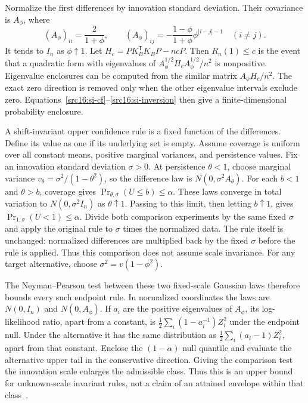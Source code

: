 Normalize the first differences by innovation standard deviation. Their covariance is $A_\phi$, where
\begin{equation}\label{src16:si-difference-cov}
 (A_\phi)_{ii}=\frac2{1+\phi},\qquad
 (A_\phi)_{ij}=-\frac{1-\phi}{1+\phi}\phi^{|i-j|-1}\quad(i\ne j).
\end{equation}
It tends to $I_n$ as $\phi\uparrow1$. Let $H_c=PK_B^{\mathsf T}K_BP-ncP$. Then $R_n(1)\le c$ is the event that a quadratic form with eigenvalues of $A_\phi^{1/2}H_cA_\phi^{1/2}/n^2$ is nonpositive. Eigenvalue enclosures can be computed from the similar matrix $A_\phi H_c/n^2$. The exact zero direction is removed only when the other eigenvalue intervals exclude zero. Equations~\eqref{src16:si-cf}--\eqref{src16:si-inversion} then give a finite-dimensional probability enclosure.

A shift-invariant upper confidence rule is a fixed function of the differences. Define its value as one if its underlying set is empty. Assume coverage is uniform over all constant means, positive marginal variances, and persistence values. Fix an innovation standard deviation $\sigma>0$. At persistence $\theta<1$, choose marginal variance $v_\theta=\sigma^2/(1-\theta^2)$, so the difference law is $N(0,\sigma^2A_\theta)$. For each $b<1$ and $\theta>b$, coverage gives $\Pr_{\theta,\sigma}(U\le b)\le\alpha$. These laws converge in total variation to $N(0,\sigma^2I_n)$ as $\theta\uparrow1$. Passing to this limit, then letting $b\uparrow1$, gives $\Pr_{1,\sigma}(U<1)\le\alpha$. Divide both comparison experiments by the same fixed $\sigma$ and apply the original rule to $\sigma$ times the normalized data. The rule itself is unchanged: normalized differences are multiplied back by the fixed $\sigma$ before the rule is applied. Thus this comparison does not assume scale invariance. For any target alternative, choose $\sigma^2=v(1-\phi^2)$.

The Neyman--Pearson test between these two fixed-scale Gaussian laws therefore bounds every such endpoint rule. In normalized coordinates the laws are $N(0,I_n)$ and $N(0,A_\phi)$. If $a_i$ are the positive eigenvalues of $A_\phi$, its log-likelihood ratio, apart from a constant, is $\tfrac12\sum_i(1-a_i^{-1})Z_i^2$ under the endpoint null. Under the alternative it has the same distribution as $\tfrac12\sum_i(a_i-1)Z_i^2$, apart from that constant. Enclose the $(1-\alpha)$ null quantile and evaluate the alternative upper tail in the conservative direction. Giving the comparison test the innovation scale enlarges the admissible class. Thus this is an upper bound for unknown-scale invariant rules, not a claim of an attained envelope within that class~\cite{dufourking1991,elliott1996}.

